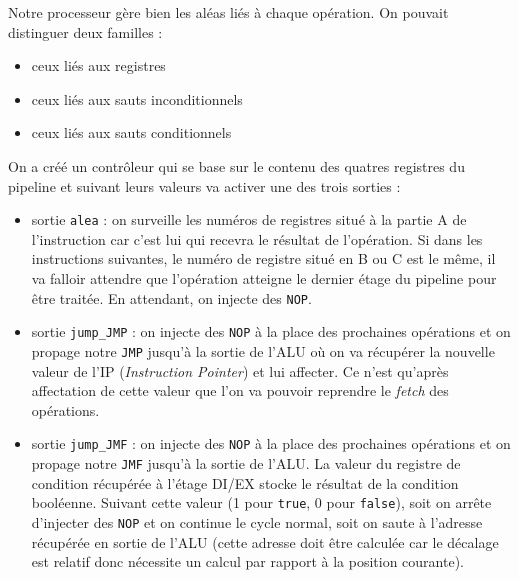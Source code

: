 Notre processeur gère bien les aléas liés à chaque opération. On pouvait distinguer deux familles :
\begin{itemize}
\item{ceux liés aux registres}
\item{ceux liés aux sauts inconditionnels}
\item{ceux liés aux sauts conditionnels}
\end{itemize}

\vspace{10pt}

On a créé un contrôleur qui se base sur le contenu des quatres registres du pipeline et suivant leurs valeurs va activer une des trois sorties :
\begin{itemize}
\item{sortie \texttt{alea} : on surveille les numéros de registres situé à la partie A de l'instruction car c'est lui qui recevra le résultat de l'opération. Si dans les instructions suivantes, le numéro de registre situé en B ou C est le même, il va falloir attendre que l'opération  atteigne le dernier étage du pipeline pour être traitée. En attendant, on injecte des \texttt{NOP}.}

\item{sortie \texttt{jump\_JMP} : on injecte des \texttt{NOP} à la place des prochaines opérations et on propage notre \texttt{JMP} jusqu'à la sortie de l'ALU où on va récupérer la nouvelle valeur de l'IP (\textit{Instruction Pointer}) et lui affecter. Ce n'est qu'après affectation de cette valeur que l'on va pouvoir reprendre le \textit{fetch} des opérations.}

\item{sortie \texttt{jump\_JMF} : on injecte des \texttt{NOP} à la place des prochaines opérations et on propage notre \texttt{JMF} jusqu'à la sortie de l'ALU. La valeur du registre de condition récupérée à  l'étage DI/EX stocke le résultat de la condition booléenne. Suivant cette valeur (1 pour \texttt{true}, 0 pour \texttt{false}), soit on arrête d'injecter des \texttt{NOP} et on continue le cycle normal, soit on saute à l'adresse récupérée en sortie de l'ALU (cette adresse doit être calculée car le décalage est relatif donc nécessite un calcul par rapport à la position courante).}
\end{itemize}

\vspace{10pt}

